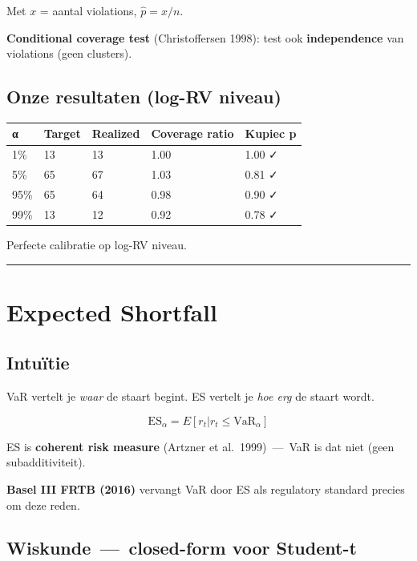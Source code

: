 \documentclass[11pt,a4paper]{article}
\begin{document}
Met \(x\) = aantal violations, \(\hat p = x/n\).

\textbf{Conditional coverage test} (Christoffersen 1998): test ook \textbf{independence} van violations (geen clusters).

\hypertarget{onze-resultaten-log-rv-niveau}{%
\subsection{Onze resultaten (log-RV niveau)}\label{onze-resultaten-log-rv-niveau}}

\begin{longtable}[]{@{}lllll@{}}
\toprule
α & Target & Realized & Coverage ratio & Kupiec p \\
\midrule
\endhead
1\% & 13 & 13 & 1.00 & 1.00 ✓ \\
5\% & 65 & 67 & 1.03 & 0.81 ✓ \\
95\% & 65 & 64 & 0.98 & 0.90 ✓ \\
99\% & 13 & 12 & 0.92 & 0.78 ✓ \\
\bottomrule
\end{longtable}

Perfecte calibratie op log-RV niveau.

\begin{center}\rule{0.5\linewidth}{0.5pt}\end{center}

\hypertarget{expected-shortfall}{%
\section{Expected Shortfall}\label{expected-shortfall}}

\hypertarget{intuuxeftie-10}{%
\subsection{Intuïtie}\label{intuuxeftie-10}}

VaR vertelt je \emph{waar} de staart begint. ES vertelt je \emph{hoe erg} de staart wordt.

\[\text{ES}_\alpha = E[r_t | r_t \leq \text{VaR}_\alpha]\]

ES is \textbf{coherent risk measure} (Artzner et al.~1999) \,---\, VaR is dat niet (geen subadditiviteit).

\textbf{Basel III FRTB (2016)} vervangt VaR door ES als regulatory standard precies om deze reden.

\hypertarget{wiskunde-closed-form-voor-student-t}{%
\subsection{Wiskunde \,---\, closed-form voor Student-t}\label{wiskunde-closed-form-voor-student-t}}
\end{document}
